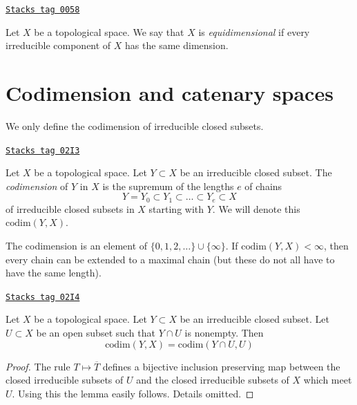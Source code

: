 \begin{definition}[Equidimensional]
\label{topology-definition-equidimensional}
\href{https://stacks.math.columbia.edu/tag/0058}{\texttt{Stacks tag 0058}}

Let $X$ be a topological space.
We say that $X$ is {\it equidimensional} if every irreducible
component of $X$ has the same dimension.
\end{definition}

\section{Codimension and catenary spaces}
\label{topology-section-catenary-spaces}
We only define the codimension of irreducible closed subsets.

\begin{definition}[Codimension]
\label{topology-definition-codimension}
\href{https://stacks.math.columbia.edu/tag/02I3}{\texttt{Stacks tag 02I3}}

Let $X$ be a topological space.
Let $Y \subset X$ be an irreducible closed subset.
The {\it codimension} of $Y$ in $X$ is the supremum of
the lengths $e$ of chains
$$
Y = Y_0 \subset Y_1 \subset \ldots \subset Y_e \subset X
$$
of irreducible closed subsets in $X$ starting with $Y$.
We will denote this $\text{codim}(Y, X)$.
\end{definition}

The codimension is an element of $\{0, 1, 2, \ldots\} \cup \{\infty\}$.
If $\text{codim}(Y, X) < \infty$, then every chain can be extended to
a maximal chain (but these do not all have to have the same length).

\begin{lemma}
\label{topology-lemma-codimension-at-generic-point}
\href{https://stacks.math.columbia.edu/tag/02I4}{\texttt{Stacks tag 02I4}}

Let $X$ be a topological space.
Let $Y \subset X$ be an irreducible closed subset.
Let $U \subset X$ be an open subset such that $Y \cap U$ is nonempty.
Then
$$
\text{codim}(Y, X) = \text{codim}(Y \cap U, U)
$$
\end{lemma}

\begin{proof}
The rule $T \mapsto \overline{T}$ defines a bijective
inclusion preserving map between the closed irreducible subsets
of $U$ and the closed irreducible subsets of $X$ which meet $U$.
Using this the lemma easily follows. Details omitted.
\end{proof}

